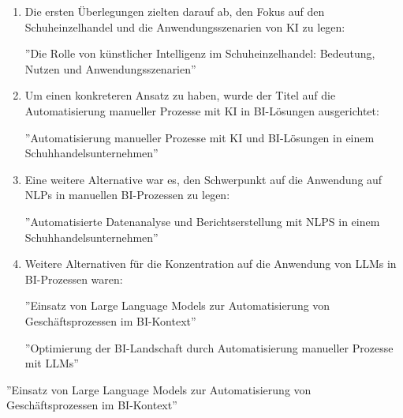 \begin{enumerate}
    \item Die ersten Überlegungen zielten darauf ab, den Fokus auf den Schuheinzelhandel und die Anwendungsszenarien von KI zu legen:
    
    ''Die Rolle von künstlicher Intelligenz im Schuheinzelhandel: Bedeutung, Nutzen und Anwendungsszenarien''

    \item Um einen konkreteren Ansatz zu haben, wurde der Titel auf die Automatisierung manueller Prozesse mit KI in BI-Lösungen ausgerichtet:
    
    ''Automatisierung manueller Prozesse mit KI und BI-Lösungen in einem Schuhhandelsunternehmen''

    \item Eine weitere Alternative war es, den Schwerpunkt auf die Anwendung auf NLPs in manuellen BI-Prozessen zu legen:
    
    ''Automatisierte Datenanalyse und Berichtserstellung mit NLPS in einem Schuhhandelsunternehmen''

    \item Weitere Alternativen für die Konzentration auf die Anwendung von LLMs in BI-Prozessen waren:
    
    ''Einsatz von Large Language Models zur Automatisierung von Geschäftsprozessen im BI-Kontext''

    ''Optimierung der BI-Landschaft durch Automatisierung manueller Prozesse mit LLMs''
\end{enumerate}
''Einsatz von Large Language Models zur Automatisierung von Geschäftsprozessen im BI-Kontext''

\clearpage